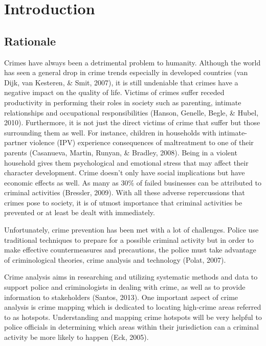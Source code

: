 
\chapter{Introduction}  %

\section{Rationale} %

    Crimes have always been a detrimental problem to humanity. Although the world has seen a general drop in crime trends especially in developed countries (van Dijk, van Kesteren, \& Smit, 2007), it is still undeniable that crimes have a negative impact on the quality of life. Victims of crimes suffer receded productivity in performing their roles in society such as parenting, intimate relationships and occupational responsibilities (Hanson, Genelle, Begle, \& Hubel, 2010). Furthermore, it is not just the direct victims of crime that suffer but those surrounding them as well. For instance, children in households with intimate-partner violence (IPV) experience consequences of maltreatment to one of their parents (Casanueva, Martin, Runyan, \& Bradley, 2008). Being in a violent household gives them psychological and emotional stress that may affect their character development. Crime doesn’t only have social implications but have economic effects as well. As many as 30\% of failed businesses can be attributed to criminal activities (Bressler, 2009). With all these adverse repercussions that crimes pose to society, it is of utmost importance that criminal activities be prevented or at least be dealt with immediately. 

    Unfortunately, crime prevention has been met with a lot of challenges. Police use traditional techniques to prepare for a possible criminal activity but in order to make effective countermeasures and precautions, the police must take advantage of criminological theories, crime analysis and technology (Polat, 2007).

    Crime analysis aims in researching and utilizing systematic methods and data to support police and criminologists in dealing with crime, as well as to provide information to stakeholders (Santos, 2013). One important aspect of crime analysis is crime mapping which is dedicated to locating high-crime areas referred to as hotspots. Understanding and mapping crime hotspots will be very helpful to police officials in determining which areas within their jurisdiction can a criminal activity be more likely to happen (Eck, 2005).

